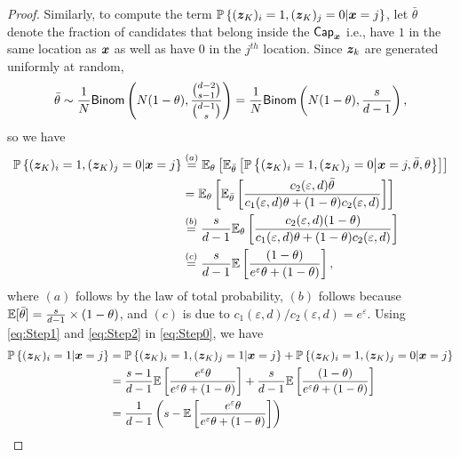 \begin{proof}
Similarly, to compute the term $\mathbb{P}\left\{ ({\boldsymbol{z}}_K)_i = 1, ({\boldsymbol{z}}_K)_j = 0 | {\boldsymbol{x}} = j \right\}$, let $\bar{\theta}$ denote the fraction of candidates that belong inside the $\mathsf{Cap}_{{\boldsymbol{x}}}$ i.e., have $1$ in the same location as ${\boldsymbol{x}}$ as well as have $0$ in the $j^{th}$ location. Since ${\boldsymbol{z}}_k$ are generated uniformly at random,
$$ \bar{\theta} \sim \frac{1}{N} \mathsf{Binom}\left( N(1-\theta), \frac{\binom{d-2}{s-1}}{\binom{d-1}{s}} \right) = \frac{1}{N} \mathsf{Binom}\left( N(1-\theta), \frac{s}{d-1} \right),$$ so we have
\begin{align}
    \mathbb{P}\left\{ ({\boldsymbol{z}}_K)_i = 1, ({\boldsymbol{z}}_K)_j = 0 | {\boldsymbol{x}} = j \right\} 
    & \stackrel{(a)}{=} \mathbb{E}_{\theta}\left[ \mathbb{E}_{\bar{\theta}}\left[ \mathbb{P}\left\{ ({\boldsymbol{z}}_K)_i = 1, ({\boldsymbol{z}}_K)_j = 0 \middle\vert {\boldsymbol{x}} = j, \bar{\theta}, \theta \right\} \right]\right] \\
    & = \mathbb{E}_{\theta}\left[ \mathbb{E}_{\bar{\theta}}\left[ \frac{ c_2(\varepsilon,d)\bar{\theta}}{ c_1(\varepsilon,d) \theta  + (1 - \theta) c_2(\varepsilon,d)} \right]\right] \\ 
    & \stackrel{(b)}{=} \frac{s}{d-1}\mathbb{E}_{\theta}\left[ \frac{ c_2(\varepsilon,d) (1-\theta)}{ c_1(\varepsilon,d)\theta +(1-\theta) c_2(\varepsilon,d)} \right] \\ 
    & \stackrel{(c)}{=} \frac{s}{d-1}\mathbb{E}\left[ \frac{(1-\theta)}{e^\varepsilon \theta + (1-\theta)} \right], \label{eq:Step2}
\end{align}
where $(a)$ follows by the law of total probability, $(b)$ follows because $\mathbb{E}[\bar{\theta}] = \frac{s}{d-1} \times (1-\theta)$, and $(c)$ is due to $c_1(\varepsilon,d)/c_2(\varepsilon,d) = e^\varepsilon$.
Using \eqref{eq:Step1} and \eqref{eq:Step2} in \eqref{eq:Step0}, we have
\begin{align}
    \Pr\lbp (\svbz_K)_i = 1 | \svbx = j \rbp 
    & = \Pr\lbp (\svbz_K)_i = 1, (\svbz_K)_j = 1 | \svbx = j \rbp+\Pr\lbp (\svbz_K)_i = 1, (\svbz_K)_j = 0 | \svbx = j \rbp \\
    & = \frac{s-1}{d-1}\E\lb \frac{e^\varepsilon \theta}{e^\varepsilon \theta + (1-\theta)} \rb + \frac{s}{d-1}\E\lb \frac{(1-\theta)}{e^\varepsilon \theta + (1-\theta)} \rb \\
    & = \frac{1}{d-1}\lp s - \E\lb \frac{e^\varepsilon \theta}{e^\varepsilon \theta +(1-\theta)}\rb \rp \label{eq:ss_step_3}

\end{align}
\end{proof}
